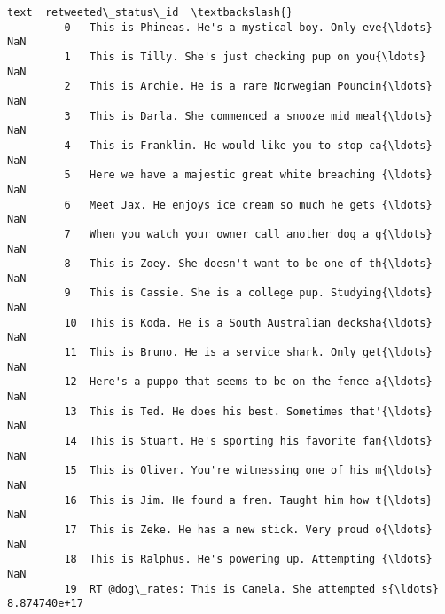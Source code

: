 \documentclass[11pt]{article}
\begin{document}
\begin{Verbatim}[commandchars=\\\{\}]
                                                          text  retweeted\_status\_id  \textbackslash{}
         0   This is Phineas. He's a mystical boy. Only eve{\ldots}                  NaN   
         1   This is Tilly. She's just checking pup on you{\ldots}                  NaN   
         2   This is Archie. He is a rare Norwegian Pouncin{\ldots}                  NaN   
         3   This is Darla. She commenced a snooze mid meal{\ldots}                  NaN   
         4   This is Franklin. He would like you to stop ca{\ldots}                  NaN   
         5   Here we have a majestic great white breaching {\ldots}                  NaN   
         6   Meet Jax. He enjoys ice cream so much he gets {\ldots}                  NaN   
         7   When you watch your owner call another dog a g{\ldots}                  NaN   
         8   This is Zoey. She doesn't want to be one of th{\ldots}                  NaN   
         9   This is Cassie. She is a college pup. Studying{\ldots}                  NaN   
         10  This is Koda. He is a South Australian decksha{\ldots}                  NaN   
         11  This is Bruno. He is a service shark. Only get{\ldots}                  NaN   
         12  Here's a puppo that seems to be on the fence a{\ldots}                  NaN   
         13  This is Ted. He does his best. Sometimes that'{\ldots}                  NaN   
         14  This is Stuart. He's sporting his favorite fan{\ldots}                  NaN   
         15  This is Oliver. You're witnessing one of his m{\ldots}                  NaN   
         16  This is Jim. He found a fren. Taught him how t{\ldots}                  NaN   
         17  This is Zeke. He has a new stick. Very proud o{\ldots}                  NaN   
         18  This is Ralphus. He's powering up. Attempting {\ldots}                  NaN   
         19  RT @dog\_rates: This is Canela. She attempted s{\ldots}         8.874740e+17   
         

\end{Verbatim}
\end{document}
